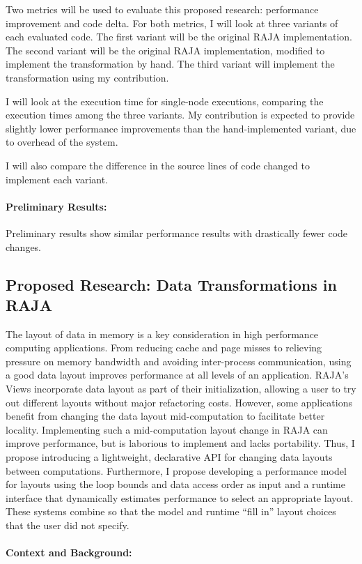 \documentclass{article}
\begin{document}
Two metrics will be used to evaluate this proposed research: performance improvement and code delta. 
For both metrics, I will look at three variants of each evaluated code.
The first variant will be the original RAJA implementation. 
The second variant will be the original RAJA implementation, modified to implement the transformation by hand.
The third variant will implement the transformation using my contribution.

I will look at the execution time for single-node executions, comparing the execution times among the three variants. My contribution is expected to provide slightly lower performance improvements than the hand-implemented variant, due to overhead of the system.

I will also compare the difference in the source lines of code changed to implement each variant.
\paragraph{Preliminary Results:}
Preliminary results show similar performance results with drastically fewer code changes.


\subsection{Proposed Research: Data Transformations in RAJA}
\label{Sec:Work2}
The layout of data in memory is a key consideration in high performance computing applications.
From reducing cache and page misses to relieving pressure on memory bandwidth and avoiding inter-process communication, using a good data layout improves performance at all levels of an application.
RAJA's Views incorporate data layout as part of their initialization, allowing a user to try out different layouts without major refactoring costs.
However, some applications benefit from changing the data layout mid-computation to facilitate better locality.
Implementing such a mid-computation layout change in RAJA can improve performance, but is laborious to implement and lacks portability.
Thus, I propose introducing a lightweight, declarative API for changing data layouts between computations.
Furthermore, I propose developing a performance model for layouts using the loop bounds and data access order as input and a runtime interface that dynamically estimates performance to select an appropriate layout. 
These systems combine so that the model and runtime \enquote{fill in} layout choices
that the user did not specify.

\paragraph{Context and Background:}
\end{document}
